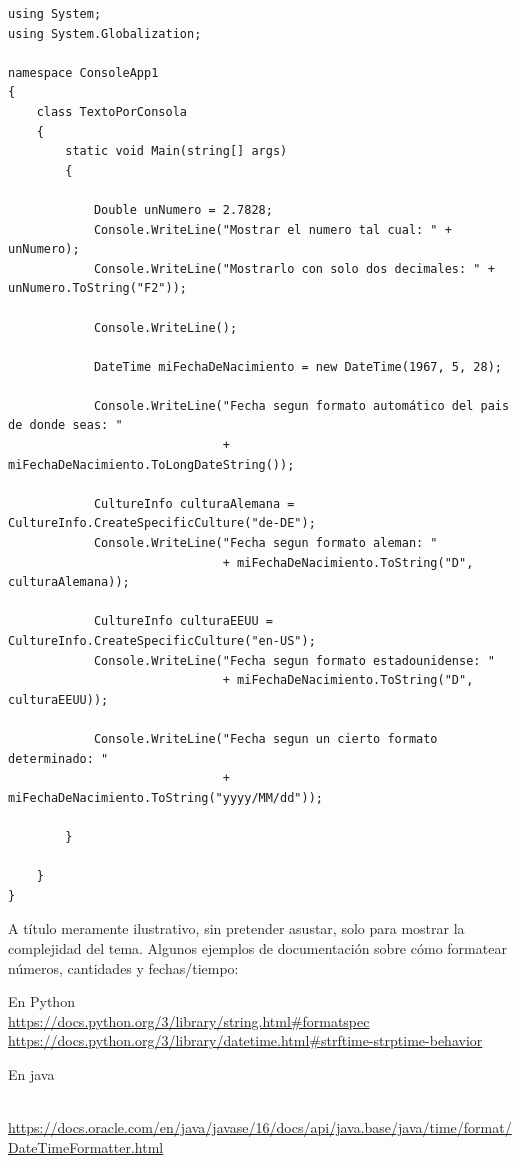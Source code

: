 \documentclass[spanish,12pt,a4paper,final,oneside]{book}
\begin{document}
\begin{lstlisting}[frame=single, caption=lenguaje C\#]
using System;
using System.Globalization;

namespace ConsoleApp1
{
    class TextoPorConsola
    {
        static void Main(string[] args)
        {

            Double unNumero = 2.7828;
            Console.WriteLine("Mostrar el numero tal cual: " + unNumero);
            Console.WriteLine("Mostrarlo con solo dos decimales: " + unNumero.ToString("F2"));

            Console.WriteLine();

            DateTime miFechaDeNacimiento = new DateTime(1967, 5, 28);

            Console.WriteLine("Fecha segun formato automático del pais de donde seas: "
                              + miFechaDeNacimiento.ToLongDateString());

            CultureInfo culturaAlemana = CultureInfo.CreateSpecificCulture("de-DE");
            Console.WriteLine("Fecha segun formato aleman: "
                              + miFechaDeNacimiento.ToString("D", culturaAlemana));

            CultureInfo culturaEEUU = CultureInfo.CreateSpecificCulture("en-US");
            Console.WriteLine("Fecha segun formato estadounidense: "
                              + miFechaDeNacimiento.ToString("D", culturaEEUU));

            Console.WriteLine("Fecha segun un cierto formato determinado: "
                              + miFechaDeNacimiento.ToString("yyyy/MM/dd"));

        }

    }
}

\end{lstlisting}


A título meramente ilustrativo, sin pretender asustar, solo para mostrar la complejidad del tema.  Algunos ejemplos de documentación sobre cómo formatear números, cantidades y fechas/tiempo:

En Python
\\ \url{https://docs.python.org/3/library/string.html#formatspec}
\\ \url{https://docs.python.org/3/library/datetime.html#strftime-strptime-behavior}

En java
\begin{footnotesize}
\\ \url{https://docs.oracle.com/en/java/javase/16/docs/api/java.base/java/time/format/DateTimeFormatter.html}
\end{footnotesize}
\end{document}
